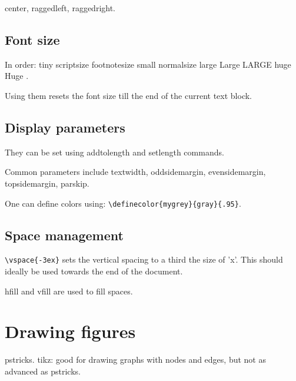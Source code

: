 center, raggedleft, raggedright.

\subsection{Font size}
In order:     tiny
    scriptsize
    footnotesize
    small
    normalsize
    large
    Large
    LARGE
    huge
    Huge .

Using them resets the font size till the end of the current text block.

\subsection{Display parameters}
They can be set using addtolength and setlength commands.

Common parameters include textwidth, oddsidemargin, evensidemargin, topsidemargin, parskip.

One can define colors using: \verb'\definecolor{mygrey}{gray}{.95}'.

\subsection{Space management}
\verb'\vspace{-3ex}' sets the vertical spacing to a third the size of 'x'. This should ideally be used towards the end of the document.

hfill and vfill are used to fill spaces.

\section{Drawing figures}
pstricks. tikz: good for drawing graphs with nodes and edges, but not as advanced as pstricks.
